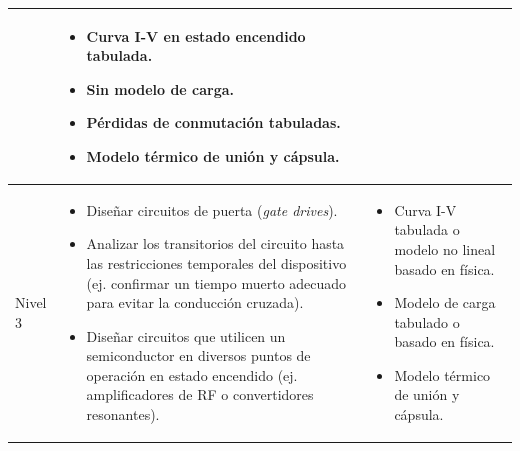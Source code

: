 \begin{longtable}{|l|p{5.8cm}|p{5.8cm}|}
\begin{itemize}
    \end{itemize} & 
    \begin{itemize}
        \item Curva I-V en estado encendido tabulada.
        \item Sin modelo de carga.
        \item Pérdidas de conmutación tabuladas.
        \item Modelo térmico de unión y cápsula.
    \end{itemize} \\
    \hline
    Nivel 3 & 
    \begin{itemize}
        \item Diseñar circuitos de puerta (\textit{gate drives}).
        \item Analizar los transitorios del circuito hasta las restricciones temporales del dispositivo (ej. confirmar un tiempo muerto adecuado para evitar la conducción cruzada).
        \item Diseñar circuitos que utilicen un semiconductor en diversos puntos de operación en estado encendido (ej. amplificadores de RF o convertidores resonantes).
    \end{itemize} & 
    \begin{itemize}
        \item Curva I-V tabulada o modelo no lineal basado en física.
        \item Modelo de carga tabulado o basado en física.
        \item Modelo térmico de unión y cápsula.
    \end{itemize} \\
    \hline
\end{longtable}

